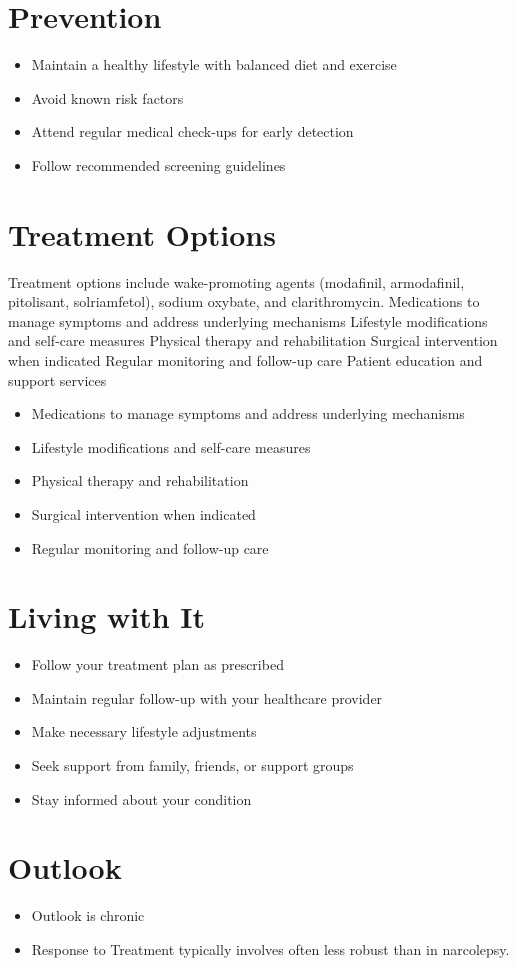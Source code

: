 \section{Prevention}
\begin{itemize}[noitemsep]
  \item Maintain a healthy lifestyle with balanced diet and exercise
  \item Avoid known risk factors
  \item Attend regular medical check-ups for early detection
  \item Follow recommended screening guidelines
\end{itemize}
\section{Treatment Options}
Treatment options include wake-promoting agents (modafinil, armodafinil, pitolisant, solriamfetol), sodium oxybate, and clarithromycin. Medications to manage symptoms and address underlying mechanisms Lifestyle modifications and self-care measures Physical therapy and rehabilitation Surgical intervention when indicated Regular monitoring and follow-up care Patient education and support services

\begin{itemize}[noitemsep]
  \item Medications to manage symptoms and address underlying mechanisms
  \item Lifestyle modifications and self-care measures
  \item Physical therapy and rehabilitation
  \item Surgical intervention when indicated
  \item Regular monitoring and follow-up care
\end{itemize}
\section{Living with It}
\begin{itemize}[noitemsep]
  \item Follow your treatment plan as prescribed
  \item Maintain regular follow-up with your healthcare provider
  \item Make necessary lifestyle adjustments
  \item Seek support from family, friends, or support groups
  \item Stay informed about your condition
\end{itemize}
\section{Outlook}
\begin{itemize}[noitemsep]
  \item Outlook is chronic
  \item Response to Treatment typically involves often less robust than in narcolepsy.
\end{itemize}
